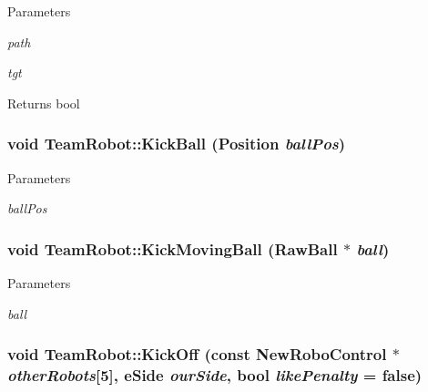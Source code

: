 \begin{DoxyParams}{Parameters}
\item[{\em path}]\item[{\em tgt}]\end{DoxyParams}
\begin{DoxyReturn}{Returns}
bool 
\end{DoxyReturn}
\hypertarget{classTeamRobot_a66ddecf846c0300c346e80b6a48d800f}{
\subsubsection[{KickBall}]{\setlength{\rightskip}{0pt plus 5cm}void TeamRobot::KickBall (Position {\em ballPos})}}
\label{classTeamRobot_a66ddecf846c0300c346e80b6a48d800f}

\begin{DoxyParams}{Parameters}
\item[{\em ballPos}]\end{DoxyParams}
\hypertarget{classTeamRobot_a98d044ad3907493236b2d399a26cb9ac}{
\subsubsection[{KickMovingBall}]{\setlength{\rightskip}{0pt plus 5cm}void TeamRobot::KickMovingBall (RawBall $\ast$ {\em ball})}}
\label{classTeamRobot_a98d044ad3907493236b2d399a26cb9ac}

\begin{DoxyParams}{Parameters}
\item[{\em ball}]\end{DoxyParams}
\hypertarget{classTeamRobot_a162c8b33d4315a61d8371dc9a923b37b}{
\subsubsection[{KickOff}]{\setlength{\rightskip}{0pt plus 5cm}void TeamRobot::KickOff (const {\bf NewRoboControl} $\ast$ {\em otherRobots}\mbox{[}5\mbox{]}, \/  eSide {\em ourSide}, \/  bool {\em likePenalty} = {\ttfamily false})}}
\label{classTeamRobot_a162c8b33d4315a61d8371dc9a923b37b}

